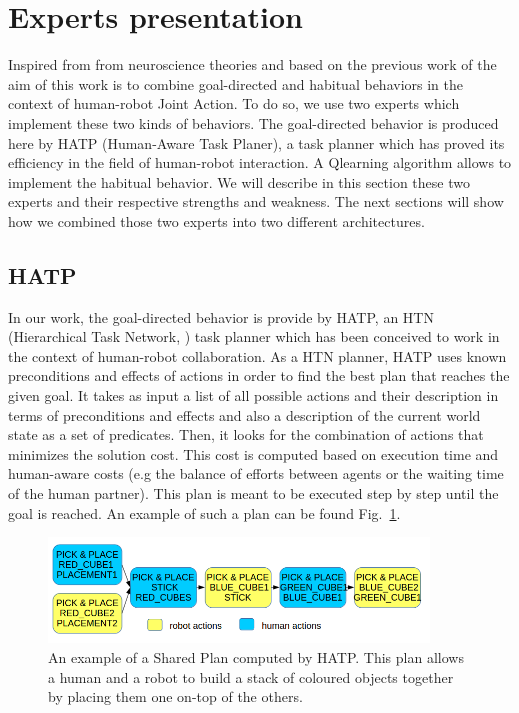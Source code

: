 \documentclass[english,a4paper,11pt,twoside]{StyleThese}
\begin{document}
\section{Experts presentation}

Inspired from from neuroscience theories and based on the previous work of \cite{renaudo2014design} the aim of this work is to combine goal-directed and habitual behaviors in the context of human-robot Joint Action. To do so, we use two experts which implement these two kinds of behaviors. The goal-directed behavior is produced here by HATP (Human-Aware Task Planer), a task planner which has proved its efficiency in the field of human-robot interaction. A Qlearning algorithm allows to implement the habitual behavior. We will describe in this section these two experts and their respective strengths and weakness. The next sections will show how we combined those two experts into two different architectures.

\subsection{HATP}

In our work, the goal-directed behavior is provide by HATP, an HTN (Hierarchical Task Network, \cite{erol1994htn}) task planner which has been conceived to work in the context of human-robot collaboration.  As a HTN planner, HATP uses known preconditions and effects of actions in order to find the best plan that reaches the given goal. It takes as input a list of all possible actions and their description in terms of preconditions and effects and also a description of the current world state as a set of predicates. Then, it looks for the combination of actions that minimizes the solution cost. This cost is computed based on execution time and human-aware costs (e.g the balance of efforts between agents or the waiting time of the human partner). This plan is meant to be executed step by step until the goal is reached. An example of such a plan can be found Fig.~\ref{fig:examplePlan}.

\begin{figure}[!h]
	\centering
    \includegraphics[width=0.9\textwidth]{figs/Chapter7/SharedPlan.png}
    \caption{An example of a Shared Plan computed by HATP. This plan allows a human and a robot to build a stack of coloured objects together by placing them one on-top of the others.}
    \label{fig:examplePlan}
\end{figure}
\end{document}
